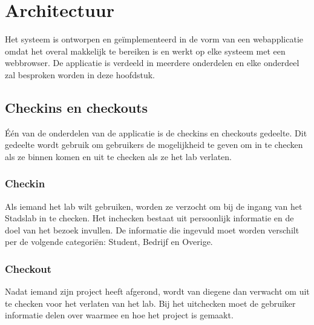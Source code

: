 \chapter{Architectuur}

Het systeem is ontworpen en ge\"implementeerd in de vorm van een webapplicatie omdat het overal makkelijk te bereiken is en werkt op elke systeem met een webbrowser. De applicatie is verdeeld in meerdere onderdelen en elke onderdeel zal besproken worden in deze hoofdstuk.

\section{Checkins en checkouts}

\'E\'en van de onderdelen van de applicatie is de checkins en checkouts gedeelte. Dit gedeelte wordt gebruik om gebruikers de mogelijkheid te geven om in te checken als ze binnen komen en uit te checken als ze het lab verlaten.

\subsection{Checkin}

Als iemand het lab wilt gebruiken, worden ze verzocht om bij de ingang van het Stadslab in te checken. Het inchecken bestaat uit persoonlijk informatie en de doel van het bezoek invullen. De informatie die ingevuld moet worden verschilt per de volgende categori\"en: Student, Bedrijf en Overige.

\subsection{Checkout}

Nadat iemand zijn project heeft afgerond, wordt van diegene dan verwacht om uit te checken voor het verlaten van het lab. Bij het uitchecken moet de gebruiker informatie delen over waarmee en hoe het project is gemaakt.

\